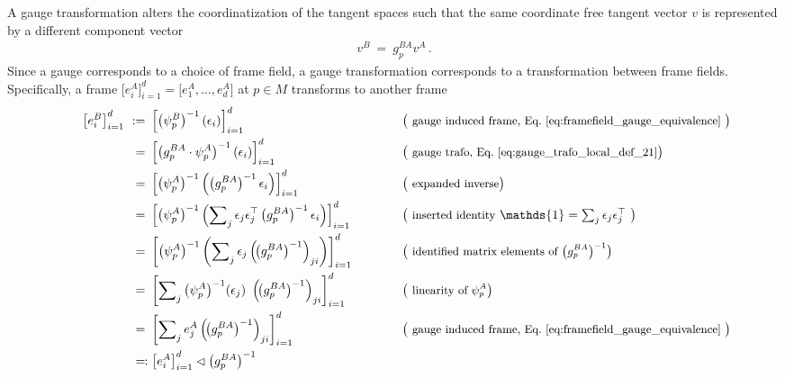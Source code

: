 A gauge transformation alters the coordinatization of the tangent spaces such that the same coordinate free tangent vector $v$ is represented by a different component vector
\begin{align}\label{eq:components_leftaction}
  v^B\ =\ g_p^{BA}v^A \,.
\end{align}
Since a gauge corresponds to a choice of frame field, a gauge transformation corresponds to a transformation between frame fields.
Specifically, a frame $\big[e_i^A\big]_{i=1}^d = \big[e_1^A,\dots,e_d^A\big]$ at $p\in M$ transforms to another frame
\begin{alignat}{3}\label{eq:frame_rightaction}
    \qquad
    \left[e_{i}^B\right]_{i=1}^d\ \notag
    :=&\ \left[ \left(\psi_p^B\right)^{-1} (\epsilon_i) \right]_{i=1}^d
        \qquad\quad && \big( \text{\small gauge induced frame, Eq.~\eqref{eq:framefield_gauge_equivalence} } \big) \notag\\
    =&\ \left[ \left(g_p^{BA} \cdot \psi_p^A\right)^{-1} \left(\epsilon_i\right) \right]_{i=1}^d
        \qquad\quad && \big( \text{\small gauge trafo, Eq.~\eqref{eq:gauge_trafo_local_def_21}} \big) \notag\\
    =&\ \left[ \left(\psi_p^A\right)^{-1} \left(\left(g_p^{BA}\right)^{-1} \epsilon_i\right) \right]_{i=1}^d
        \qquad\quad && \big( \text{\small expanded inverse} \big) \notag\\
    =&\ \left[ \left(\psi_p^A\right)^{-1} \left(\sum\nolimits_j \epsilon_j \epsilon_j^\top \left(g_p^{BA}\right)^{-1} \epsilon_i\right) \right]_{i=1}^d
        \qquad\quad && \big( \text{\small inserted identity}\ {\textstyle\mathds{1}=\sum_j\epsilon_j\epsilon_j^\top}\ \big) \notag\\
    =&\ \left[ \left(\psi_p^A\right)^{-1} \left(\sum\nolimits_j \epsilon_j \left(\!\left(g_p^{BA}\right)^{-1}\right)_{ji} \right) \right]_{i=1}^d
        \qquad\quad && \big( \text{\small identified matrix elements of $\big(g_p^{BA}\big)^{-1}$} \big) \notag\\
    =&\ \left[ \sum\nolimits_j \left(\psi_p^A\right)^{-1}\! (\epsilon_j)\ \left(\!\left(g_p^{BA}\right)^{-1}\right)_{ji} \right]_{i=1}^d
        \qquad\quad && \big( \text{\small linearity of $\psi_p^A$} \big) \notag\\
    =&\ \left[ \sum\nolimits_j e_{j}^A \left(\!\left(g_p^{BA}\right)^{-1}\right)_{ji} \right]_{i=1}^d
        \qquad\quad && \big( \text{\small gauge induced frame, Eq.~\eqref{eq:framefield_gauge_equivalence} } \big) \notag\\
    =&\mkern-6mu: \left[ e_{i}^A \right]_{i=1}^d \lhd \left(g_p^{BA}\right)^{-1}
        \qquad\qquad &&
\end{alignat}
